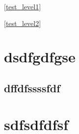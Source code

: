 

\GHz
\clock
\degreeCelsius
\ref{test_level1}

\ref{test_level2}
\section{dsdfgdfgse}

\subsection{dffdfssssfdf}
\cite{texbook}
\section{sdfsdfdfsf}


